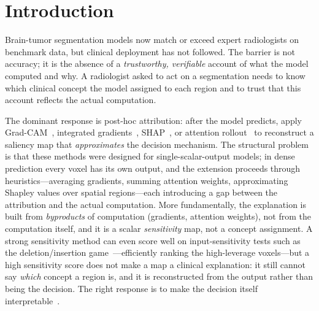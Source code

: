\documentclass[runningheads]{llncs}
\newcommand{\casfg}{\mathrm{CAS}_{\mathrm{fg}}}
\begin{document}
\begin{abstract}
it discriminates concepts at $0.88$, far above every post-hoc method, while remaining upstream
(DD${>}0$) and intrinsic. We report the full battery openly, including where CCR loses: integrated
gradients and occlusion win deletion \emph{sensitivity}, which they optimize directly, and the
posterior wins discriminability. Two controls show the remaining gap is largely structural rather
than informational---matching the posterior to the router's $16^3$ decision budget removes about
half of it, and on edema the two become statistically indistinguishable---while CCR \emph{exceeds}
the posterior on insertion. Ablations confirm concept alignment is \emph{learned} (it collapses
without the alignment loss) and that warm-up is a stabilizing default, not a requirement. Dropped
\emph{unchanged} into a SegResNet CNN (CCR-SegResNet), the same module reproduces every result from
scratch ($\casfg$ up to $0.96$), so the principle is backbone-agnostic.
\end{abstract}

\section{Introduction}
Brain-tumor segmentation models now match or exceed expert radiologists on benchmark
data, but clinical deployment has not followed. The barrier is not accuracy; it is the
absence of a \emph{trustworthy, verifiable} account of what the model computed and why. A
radiologist asked to act on a segmentation needs to know which clinical concept the model
assigned to each region and to trust that this account reflects the actual computation.

The dominant response is post-hoc attribution: after the model predicts, apply
Grad-CAM~\cite{selvaraju2017gradcam}, integrated gradients~\cite{sundararajan2017ig},
SHAP~\cite{lundberg2017shap}, or attention rollout~\cite{abnar2020rollout} to reconstruct
a saliency map that \emph{approximates} the decision mechanism. The structural problem is
that these methods were designed for single-scalar-output models; in dense prediction
every voxel has its own output, and the extension proceeds through heuristics---averaging
gradients, summing attention weights, approximating Shapley values over spatial
regions---each introducing a gap between the attribution and the actual computation. More
fundamentally, the explanation is built from \emph{byproducts} of computation (gradients,
attention weights), not from the computation itself, and it is a scalar \emph{sensitivity} map,
not a concept assignment. A strong sensitivity method can even score well on input-sensitivity
tests such as the deletion/insertion game~\cite{petsiuk2018rise}---efficiently ranking the
high-leverage voxels---but a high sensitivity score does not make a map a clinical explanation:
it still cannot say \emph{which} concept a region is, and it is reconstructed from the output
rather than being the decision. The right response is to make the decision itself
interpretable~\cite{rudin2019stop}.
\end{document}
